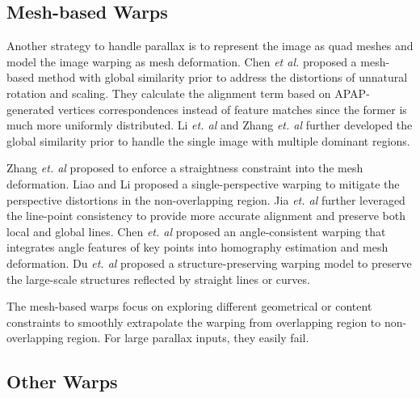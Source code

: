 \documentclass[10pt,twocolumn,letterpaper]{article}
\begin{document}
\subsection{Mesh-based Warps}

Another strategy to handle parallax is to represent the image as quad meshes and model the image warping as mesh deformation. Chen \emph{et al.} \cite{chen2016natural} proposed a mesh-based method with global similarity prior to address the distortions of unnatural rotation and scaling. They calculate the alignment term based on APAP-generated vertices correspondences instead of feature matches since the former is much more uniformly distributed. Li \emph{et. al} \cite{li2021image} and Zhang \emph{et. al} \cite{zhang2021natural} further developed the global similarity prior to handle the single image with multiple dominant regions.

Zhang \emph{et. al} \cite{zhang2016multi} proposed to enforce a straightness constraint into the mesh deformation.  Liao and Li \cite{liao2020Single} proposed a single-perspective warping to mitigate the perspective distortions in the non-overlapping region. Jia \emph{et. al} \cite{jia2021Leveraging} further leveraged the line-point consistency to provide more accurate alignment and preserve both local and global lines. Chen \emph{et. al} \cite{chen2021Image} proposed an angle-consistent warping that integrates angle features of key points into homography estimation and mesh deformation. Du \emph{et. al} \cite{du2022Geometric} proposed a structure-preserving warping model to preserve the large-scale structures reflected by straight lines or curves.

The mesh-based warps focus on exploring different geometrical or content constraints to smoothly extrapolate the warping from overlapping region to non-overlapping region. For large parallax inputs, they easily fail.

\subsection{Other Warps}
\end{document}
